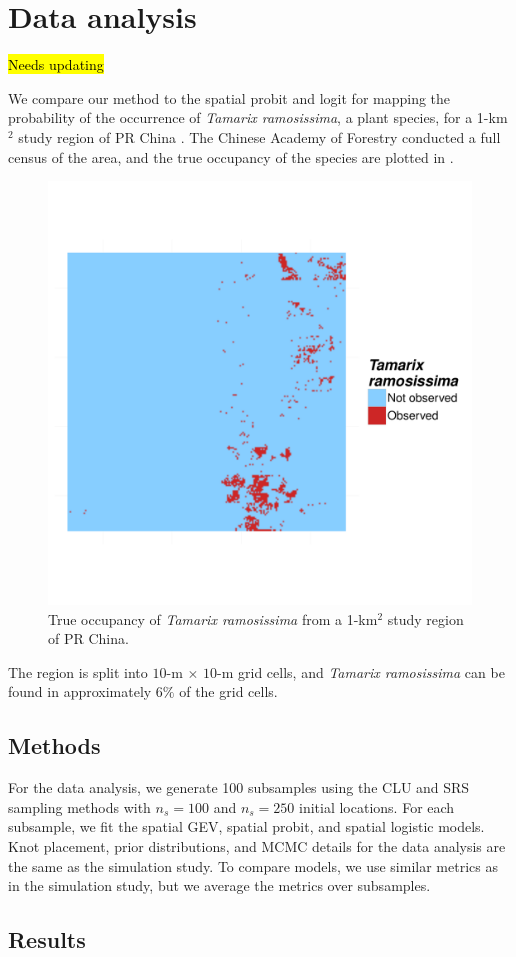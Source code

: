 \documentclass[11pt]{article}
\begin{document}
\section{Data analysis}\label{rbs:dataanalysis}
\hl{Needs updating}

We compare our method to the spatial probit and logit for mapping the probability of the occurrence of \emph{Tamarix ramosissima}, a plant species, for a 1-km$^2$ study region of PR China \citep{Smith2012}.
The Chinese Academy of Forestry conducted a full census of the area, and the true occupancy of the species are plotted in .
\begin{figure}
  \centering
  \includegraphics[width=0.5\linewidth, trim=0 10em 0 10em]{plots/tamarix-census.pdf}
  \caption{True occupancy of \emph{Tamarix ramosissima} from a 1-km$^2$ study region of PR China.}
  \label{rbfig:occupancy}
\end{figure}
The region is split into $10$-m $\times$ $10$-m grid cells, and \emph{Tamarix ramosissima} can be found in approximately $6\%$ of the grid cells.

\subsection{Methods} \label{rbs:datamethods}
For the data analysis, we generate 100 subsamples using the CLU and SRS sampling methods with $n_s = 100$ and $n_s = 250$ initial locations.
For each subsample, we fit the spatial GEV, spatial probit, and spatial logistic models.
Knot placement, prior distributions, and MCMC details for the data analysis are the same as the simulation study.
To compare models, we use similar metrics as in the simulation study, but we average the metrics over subsamples.

\subsection{Results}\label{rbs:dataresults}
\end{document}
